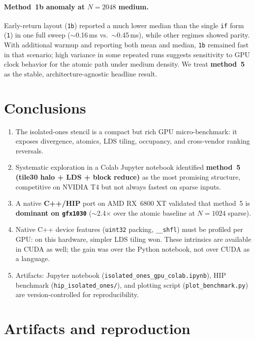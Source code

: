 \documentclass[11pt,a4paper]{article}
\begin{document}
\paragraph{Method~1b anomaly at $N{=}2048$ medium.}
Early-return layout (\texttt{1b}) reported a much lower median than the single
\texttt{if} form (\texttt{1}) in one full sweep ($\sim$0.16\,ms vs.\ $\sim$0.45\,ms),
while other regimes showed parity.
With additional warmup and reporting both mean and median, \texttt{1b} remained
fast in that scenario; high variance in some repeated runs suggests sensitivity
to GPU clock behavior for the atomic path under medium density.
We treat \textbf{method~5} as the stable, architecture-agnostic headline result.

\section{Conclusions}
\label{sec:conclusions}

\begin{enumerate}
  \item The isolated-ones stencil is a compact but rich GPU micro-benchmark:
        it exposes divergence, atomics, LDS tiling, occupancy, and
        cross-vendor ranking reversals.
  \item Systematic exploration in a Colab Jupyter notebook identified
        \textbf{method~5 (tile30 halo + LDS + block reduce)} as the most
        promising structure, competitive on NVIDIA T4 but not always fastest on
        sparse inputs.
  \item A native \textbf{C++/HIP} port on AMD RX~6800 XT validated that method~5
        is \textbf{dominant on \texttt{gfx1030}} ($\sim$2.4$\times$ over the
        atomic baseline at $N{=}1024$ sparse).
  \item Native C++ device features (\texttt{uint32} packing, \texttt{\_\_shfl})
        must be profiled per GPU: on this hardware, simpler LDS tiling won.
        These intrinsics are available in CUDA as well; the gain was over the
        Python notebook, not over CUDA as a language.
  \item Artifacts: Jupyter notebook
        (\texttt{isolated\_ones\_gpu\_colab.ipynb}), HIP benchmark
        (\texttt{hip\_isolated\_ones/}), and plotting script
        (\texttt{plot\_benchmark.py}) are version-controlled for reproducibility.
\end{enumerate}

\section*{Artifacts and reproduction}
\end{document}
